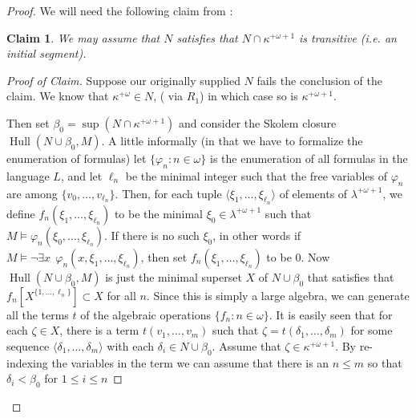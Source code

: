 \documentclass{amsart}
\theoremstyle{plain}
\theoremstyle{definition}
\theoremstyle{remark}
\theoremstyle{plain}
\newtheorem*{claim*}{Claim}
\theoremstyle{definition}
\theoremstyle{remark}
\begin{document}
\begin{proof}
          We will need the following claim from \cite{MR1045371}:

          \begin{claim*} We may assume that $N$ satisfies that
           $N\cap \kappa^{+\omega+1}$ is transitive (i.e. an initial segment).
          \end{claim*}

          \begin{proof}[Proof of Claim]
          Suppose  our originally supplied $N$ fails the conclusion of the
          claim.
          We   know that $\kappa^{+\omega}\in N$,
          (  via $R_1$)
          in which case so is $\kappa^{+\omega+1}$.


          Then set $\beta_0 = \sup(N\cap \kappa^{+\omega+1})$ and consider the
          Skolem closure $\mathop{Hull}(N\cup \beta_0, M)$.  A little informally
          (in that we have to formalize the enumeration of formulas)
          let $\{\varphi_n : n\in \omega\}$ is the enumeration of all formulas
          in the language $L$, and let  $\ell_n$ be the minimal integer such
          that the free variables of $\varphi_n$ are among
           $\{ v_0, \ldots, v_{\ell_n}\}$.
          Then,   for each tuple
          $\langle \xi_1,\ldots, \xi_{\ell_n} \rangle$
          of elements of $\lambda^{+\omega+1}$,
           we define $f_n(\xi_1,\ldots, \xi_{\ell_n})$ to be
           the minimal $\xi_0\in \lambda^{+\omega+1}$ such that
           $M\models \varphi_n(\xi_0,\ldots, \xi_{\ell_n})$.
          If there is no such $\xi_0$,
             in other words if $M\models \lnot\exists x~~  \varphi_n(x,\xi_1,
          \ldots,\xi_{\ell_n})$, then set
           $f_n(\xi_1,\ldots, \xi_{\ell_n})$ to be $0$.
          Now $\mathop{Hull}(N\cup \beta_0,M)$ is just the minimal superset
           $X$
          of $N\cup \beta_0$ that satisfies that
           $f_n[X^{\{1,\ldots,\ell_n\}}] \subset X$ for all $n$. Since this is
           simply a large algebra, we can generate all the terms $t$ of
          the algebraic operations $\{ f_n : n\in \omega\}$.
          It is easily seen that for each $\zeta \in X$, there is a term
          $t(v_1,\ldots, v_m)$ such that $\zeta  = t(\delta_1,\ldots, \delta_m)$
           for some sequence $\langle \delta_1,\ldots, \delta_m\rangle$ with
           each $\delta_i\in  N\cup \beta_0$.
           Assume that
            $\zeta\in \kappa^{+\omega+1}$. By
            re-indexing the variables in the term we can assume
            that there is an $n\leq m$ so that
             $\delta_i  <\beta_0$ for $1\leq i\leq n$

\end{proof}
\end{proof}
\end{document}
